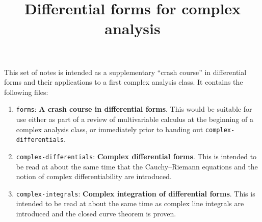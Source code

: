 \documentclass[12pt]{amsart}
\title{Differential forms for complex analysis}
\begin{document}
\maketitle

This set of notes is intended as a supplementary ``crash course'' in differential forms and their applications to a first complex analysis class.
It contains the following files:
\begin{enumerate}
\item \texttt{forms}: \textbf{A crash course in differential forms}.
  This would be suitable for use either as part of a review of multivariable calculus at the beginning of a complex analysis class, or immediately prior to handing out \texttt{complex-differentials}.
\item \texttt{complex-differentials}: \textbf{Complex differential forms}.
  This is intended to be read at about the same time that the Cauchy--Riemann equations and the notion of complex differentiability are introduced.
\item \texttt{complex-integrals}: \textbf{Complex integration of differential forms}.
  This is intended to be read at about the same time as complex line integrals are introduced and the closed curve theorem is proven.
\end{enumerate}
\end{document}

